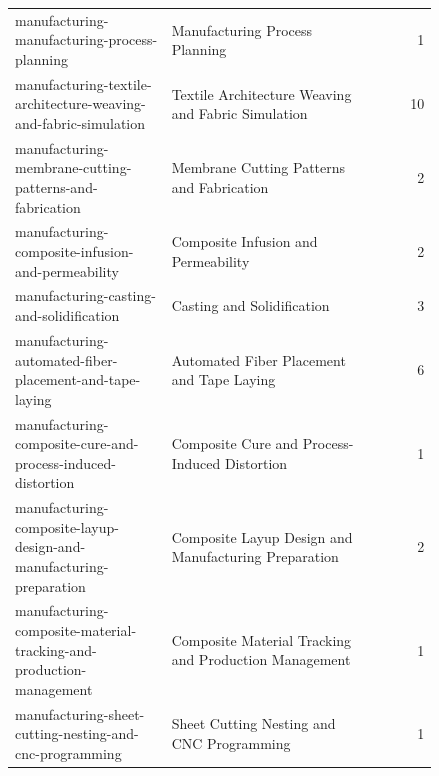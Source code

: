 \begin{longtable}{p{0.37\linewidth}p{0.47\linewidth}r}
manufacturing-manufacturing-process-planning & Manufacturing Process Planning & 1\\
manufacturing-textile-architecture-weaving-and-fabric-simulation & Textile Architecture Weaving and Fabric Simulation & 10\\
manufacturing-membrane-cutting-patterns-and-fabrication & Membrane Cutting Patterns and Fabrication & 2\\
manufacturing-composite-infusion-and-permeability & Composite Infusion and Permeability & 2\\
manufacturing-casting-and-solidification & Casting and Solidification & 3\\
manufacturing-automated-fiber-placement-and-tape-laying & Automated Fiber Placement and Tape Laying & 6\\
manufacturing-composite-cure-and-process-induced-distortion & Composite Cure and Process-Induced Distortion & 1\\
manufacturing-composite-layup-design-and-manufacturing-preparation & Composite Layup Design and Manufacturing Preparation & 2\\
manufacturing-composite-material-tracking-and-production-management & Composite Material Tracking and Production Management & 1\\
manufacturing-sheet-cutting-nesting-and-cnc-programming & Sheet Cutting Nesting and CNC Programming & 1\\
\end{longtable}
